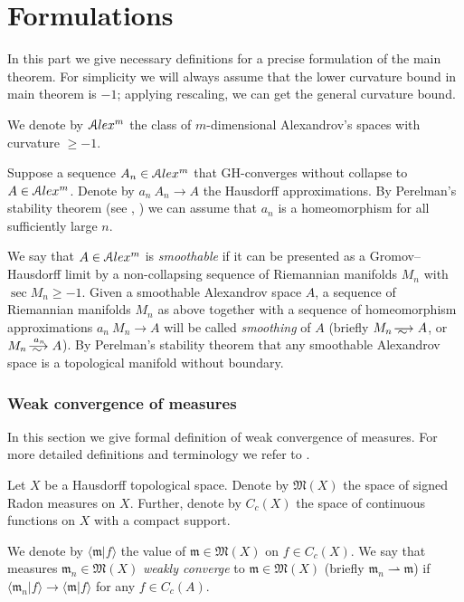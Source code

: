 \part{Formulations}

In this part we give necessary definitions for a precise formulation of the main theorem.
For simplicity  we will always assume that the lower
curvature bound in main theorem is  $-1$;
applying rescaling, we can get the general curvature bound.

We denote by
$\mathcal{A}lex^m$ the class of $m$-dimensional Alexandrov's spaces
with curvature $\ge -1$.

Suppose a sequence $A_n\in \mathcal{A}lex^m$ that GH-converges without collapse to 
$A\in \mathcal{A}lex^m$.
Denote by $a_n\:A_n\to A$ the Hausdorff approximations.
By Perelman's stability theorem (see \cite{PerStab}, \cite{KapStab}) we can assume that $a_n$ is a homeomorphism for all sufficiently large $n$.

We say that $A\in \mathcal{A}lex^m$ is \emph{smoothable}
if it can be presented as a Gromov--Hausdorff limit by a non-collapsing sequence of Riemannian manifolds $M_n$ with $\sec M_n\ge-1$.
Given a smoothable Alexandrov space $A$,
a sequence of Riemannian manifolds $M_n$ as above
together with a sequence of homeomorphism approximations $a_n\:M_n\to A$
will be called \emph{smoothing} of $A$
(briefly $M_n\smooths{} A$, or $M_n\smooths{a_n} A$).
By Perelman's stability theorem that any smoothable Alexandrov space is a topological manifold without boundary.

\section{Weak convergence of measures}

In this section we give formal definition of weak convergence of measures.
For more detailed definitions and terminology we refer to
\cite{GMS}.

Let $X$ be a Hausdorff topological space.
Denote by $\mathfrak M(X)$ the space of signed Radon measures on $X$.
Further, denote by $C_c(X)$  the space of continuous functions on $X$
with a compact support. 

We  denote by $\langle \mathfrak m|f\rangle $ the value of $\mathfrak m\in\mathfrak M(X)$ on $f\in C_c(X)$.
We say that measures $\mathfrak m_n\in \mathfrak M(X)$ \emph{weakly converge} to $\mathfrak m\in \mathfrak M(X)$ (briefly
$\mathfrak m_n\rightharpoonup \mathfrak m$) if $\langle \mathfrak m_n|f\rangle \to \langle \mathfrak m|f\rangle $ for any $f\in C_c(A)$.

